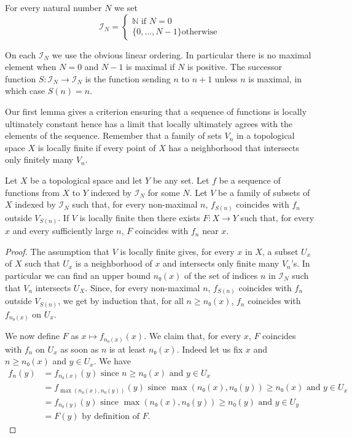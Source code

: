 \documentclass[10pt,a4paper]{article}
\newcommand{\co}{\!:}
\newcommand{\IT}[1]{\mathcal{I}_{#1}}
\newcommand{\uses}[1]{}
\newcommand{\lean}[1]{}
\newcommand{\leanok}{}
\begin{document}
\begin{definition}
  \label{def:index_type}\lean{IndexType}\leanok
  For every natural number $N$ we set
  \[
    \IT{N} =
    \begin{cases}
      ℕ \text{ if $N = 0$}\\
      \{0, \dots, N - 1\} \text{otherwise}
    \end{cases}
  \]
\end{definition}

On each $\IT{N}$ we use the obvious linear ordering. In particular there is no
maximal element when $N = 0$ and $N-1$ is maximal if $N$ is positive.
The successor function $S \co \IT{N} → \IT{N}$ is the function sending $n$ to
$n+1$ unless $n$ is maximal, in which case $S(n) = n$.

Our first lemma gives a criterion ensuring that a sequence of functions is locally
ultimately constant hence has a limit that locally ultimately agrees with the
elements of the sequence.
Remember that a family of sets $V_n$ in a topological space $X$ is locally finite if
every point of $X$ has a neighborhood that intersects only finitely many $V_n$.

\begin{lemma}
  \label{lem:exists_forall_eventually_of_index_type}
  \uses{def:index_type}
  \lean{LocallyFinite.exists_forall_eventually_of_indexType}
  \leanok
  Let $X$ be a topological space and let $Y$ be any set. Let
  $f$ be a sequence of functions from $X$ to $Y$ indexed by $\IT{N}$
  for some $N$. Let $V$ be a family of subsets of $X$ indexed by $\IT{N}$
  such that, for every non-maximal $n$, $f_{S(n)}$ coincides with $f_n$ outside
  $V_{S(n)}$. If $V$ is locally finite then there exists $F \co X → Y$ such
  that, for every $x$ and every sufficiently large $n$,
  $F$ coincides with $f_n$ near $x$.
\end{lemma}

\begin{proof}\leanok
  The assumption that $V$ is locally finite gives, for every $x$ in $X$, a
  subset $U_x$ of $X$ such that $U_x$ is a neighborhood of $x$ and intersects
  only finite many $V_n$'s. In particular we can find an upper bound $n₀(x)$ of the set
  of indices $n$ in $\IT{N}$ such that $V_n$ intersects $U_X$.
  Since, for every non-maximal $n$, $f_{S(n)}$ coincides with $f_n$ outside
  $V_{S(n)}$, we get by induction that, for all $n ≥ n₀(x)$, $f_n$ coincides
  with $f_{n₀(x)}$ on $U_x$.

  We now define $F$ as $x ↦ f_{n₀(x)}(x)$. We claim that, for every $x$,
  $F$ coincides with $f_n$ on $U_x$ as soon as $n$ is at least $n₀(x)$.
  Indeed let us fix $x$ and $n ≥ n₀(x)$ and $y ∈ U_x$. We have
  \begin{align*}
    f_n(y) &= f_{n₀(x)}(y) \text{ since $n ≥ n₀(x)$ and $y ∈ U_x$}\\
           &= f_{\max(n₀(x), n₀(y))}(y) \text{ since $\max(n₀(x), n₀(y)) ≥ n₀(x)$ and $y ∈ U_x$}\\
           &= f_{n₀(y)}(y) \text{ since $\max(n₀(x), n₀(y)) ≥ n₀(y)$ and $y ∈ U_y$}\\
           &= F(y) \text{ by definition of $F$}.
  \end{align*}
\end{proof}
\end{document}
